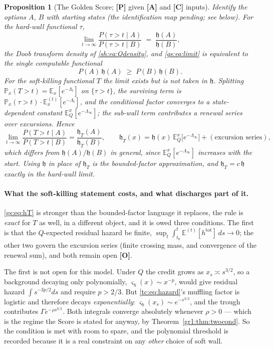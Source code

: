 \documentclass[11pt]{article}
\numberwithin{equation}{section}
\theoremstyle{plain}
\newtheorem{proposition}[theorem]{Proposition}
\theoremstyle{definition}
\theoremstyle{remark}
\newcommand{\E}{\mathbb{E}}
\newcommand{\PP}{\mathbb{P}}
\newcommand{\hm}{\mathfrak{h}}
\begin{document}
\begin{proposition}[The Golden Score; \textbf{[P]} given \textbf{[A]} and \textbf{[C]} inputs]\label{gs:prop:score}
Identify the options $A$, $B$ with starting states (the identification map pending; see below). For the hard-wall functional $\tau$,
\begin{equation}\label{gs:eq:harmonic}
    \lim_{t \to \infty} \frac{P(\tau > t \mid A)}{P(\tau > t \mid B)} \;=\; \frac{\hm(A)}{\hm(B)},
\end{equation}
the Doob transform density of \eqref{sh:eq:Qdensity}, and \eqref{gs:eq:limit} is equivalent to the single computable functional
\begin{equation}\label{gs:eq:functional}
    P(A)\,\hm(A) \;\ge\; P(B)\,\hm(B).
\end{equation}
For the soft-killing functional $T$ the limit exists but is \emph{not} taken in $\hm$. Splitting $\PP_x(T>t)=\E_x[e^{-\Lambda_t}]$ on $\{\tau>t\}$, the surviving term is $\PP_x(\tau>t)\cdot\E^{(t)}_x[e^{-\Lambda_t}]$, and the conditional factor converges to a \emph{state-dependent} constant $\E^x_Q[e^{-\Lambda_\infty}]$; the sub-wall term contributes a renewal series over excursions. Hence
\begin{equation}\label{gs:eq:hT}
\lim_{t\to\infty}\frac{P(T>t\mid A)}{P(T>t\mid B)}=\frac{\hm_T(A)}{\hm_T(B)},
\qquad
\hm_T(x)=\hm(x)\,\E^x_Q\bigl[e^{-\Lambda_\infty}\bigr]+(\text{excursion series}),
\end{equation}
which differs from $\hm(A)/\hm(B)$ in general, since $\E^x_Q[e^{-\Lambda_\infty}]$ increases with the start. Using $\hm$ in place of $\hm_T$ is the bounded-factor approximation, and $\hm_T=c\,\hm$ exactly in the hard-wall limit.
\end{proposition}

\paragraph{What the soft-killing statement costs, and what discharges part of it.}\label{gs:rem:hT}
\eqref{gs:eq:hT} is stronger than the bounded-factor language it replaces, the rule is
\emph{exact} for $T$ as well, in a different object, and it is owed three conditions. The
first is that the $Q$-expected residual hazard be finite,
$\sup_t\int_{t_0}^t\E^{(t)}[h^{\mathrm{tot}}]\,ds\to0$; the other two govern the excursion
series (finite crossing mass, and convergence of the renewal sum), and both remain open
\textbf{[O]}.

The first is not open for this model. Under $Q$ the credit grows as $x_s\asymp s^{3/2}$, so a
background decaying only polynomially, $\varsigma_b(x)\sim x^{-p}$, would give residual hazard
$\int s^{-3p/2}ds$ and require $p>2/3$. But \eqref{tc:eq:hazard}'s muffling factor is logistic
and therefore decays \emph{exponentially}: $\varsigma_b(x_s)\sim e^{-s^{3/2}}$, and the trough
contributes $\Gamma e^{-\rho s^{3/2}}$. Both integrals converge absolutely whenever $\rho>0$ ---
which is the regime the Score is stated for anyway, by
Theorem~\ref{gr1:thm:twocond}. So the condition is met with room to spare, and the polynomial
threshold is recorded because it is a real constraint on any \emph{other} choice of soft wall.
\end{document}
